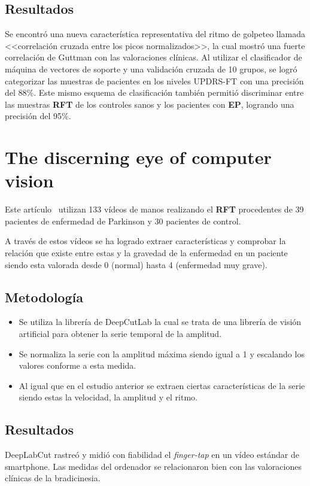 \subsection{Resultados}
Se encontró una nueva característica representativa del ritmo de golpeteo llamada <<correlación cruzada entre los picos normalizados>>, la cual mostró una fuerte correlación de Guttman con las valoraciones clínicas. Al utilizar el clasificador de máquina de vectores de soporte y una validación cruzada de 10 grupos, se logró categorizar las muestras de pacientes en los niveles UPDRS-FT con una precisión del 88\%. Este mismo esquema de clasificación también permitió discriminar entre las muestras \textbf{RFT} de los controles sanos y los pacientes con \textbf{EP}, logrando una precisión del 95\%.


\section{The discerning eye of computer vision}
Este artículo~\cite{williams2020discerning} utilizan 133 vídeos de manos realizando el \textbf{RFT} procedentes de 39 pacientes de enfermedad de Parkinson y 30 pacientes de control.

A través de estos vídeos se ha logrado extraer características y comprobar la relación que existe entre estas y la gravedad de la enfermedad en un paciente siendo esta valorada desde 0 (normal) hasta 4 (enfermedad muy grave).


\subsection{Metodología}
\begin{itemize}


	\item Se utiliza la librería de DeepCutLab la cual se trata de una librería de visión artificial para obtener la serie temporal de la amplitud.
	\item Se normaliza la serie con la amplitud máxima siendo igual a 1 y escalando los valores conforme a esta medida.
	\item Al igual que en el estudio anterior se extraen ciertas características de la serie siendo estas la velocidad, la amplitud y el ritmo.
\end{itemize}
\subsection{Resultados}
DeepLabCut rastreó y midió con fiabilidad el \textit{finger-tap} en un vídeo estándar de smartphone. Las medidas del ordenador se relacionaron bien con las valoraciones clínicas de la bradicinesia.


